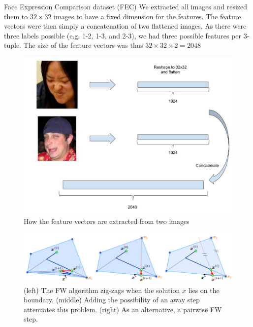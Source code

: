 \documentclass[final]{beamer}
\newlength{\colwidth}
\begin{document}
\begin{frame}[t]
\begin{columns}[t]
\begin{column}{\colwidth}
\begin{alertblock}{Face Expression Comparison dataset (FEC)}
    We extracted all images and resized them to $32 \times 32$ images to have a fixed dimension for the features. The feature vectors
    were then simply a concatenation of two flattened images. As there were three labels possible (e.g. 1-2, 1-3, and 2-3), we had three
    possible features per 3-tuple. The size of the feature vectors was thus $32 \times 32 \times 2 = 2048$

    \begin{figure}
      \includegraphics[scale=0.75]{img/fec_poster.jpg}
      \caption{How the feature vectors are extracted from two images}
      \label{feat_vec}
    \end{figure}
  \end{alertblock}

    \begin{figure}
     \includegraphics[width=\linewidth]{img/fig2.png}
     \caption{(left) The FW algorithm zig-zags when the solution $x$ lies on the boundary. (middle) Adding the possibility of an away step attenuates this problem. (right) As an alternative, a pairwise FW step.}
    \label{fig:Away steps}
   \end{figure}
    

\end{column}
\end{columns}
\end{frame}
\end{document}
